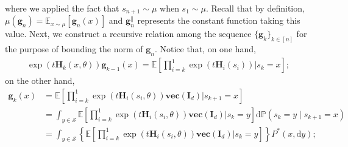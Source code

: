 where we applied the fact that $s_{n+1} \sim \mu$ when $s_1 \sim \mu$. Recall that by definition, $\mu(\bm{g}_n) = \mathbb{E}_{x \sim \mu}[\bm{g}_n(x)]$ and $\bm{g}_n^{\parallel}$ represents the constant function taking this value.
Next, we construct a recursive relation among the sequence $\{\bm{g}_k\}_{k \in [n]}$ for the purpose of bounding the norm of $\bm{g}_n$. Notice that, on one hand,
\begin{align*}
\exp\left(t\bm{H}_k(x,\theta)\right)\bm{g}_{k-1}(x) = \mathbb{E}\left[\prod_{i=k}^1 \exp(t\bm{H}_i(s_i))\bigg| s_{k} = x\right];
\end{align*}
on the other hand, %
\begin{align*}
\bm{g}_k(x) &= \mathbb{E}\left[\prod_{i=k}^1 \exp(t\bm{H}_i(s_i,\theta))\textbf{vec}(\bm{I}_d)\bigg| s_{k+1} = x\right] \\ 
&=  \int_{y \in \mathcal{S}} \mathbb{E}\left[\prod_{i=k}^1 \exp(t\bm{H}_i(s_i,\theta))\textbf{vec}(\bm{I}_d)\bigg| s_{k} = y\right] \mathrm{d}\mathbb{P}(s_k = y\mid s_{k+1} = x) \\ 
&= \int_{y \in \mathcal{S}} \left\{\mathbb{E}\left[\prod_{i=k}^1 \exp(t\bm{H}_i(s_i,\theta))\textbf{vec}(\bm{I}_d)\bigg| s_{k} = y\right] \right\}P^*(x,\mathrm{d}y);
\end{align*}
